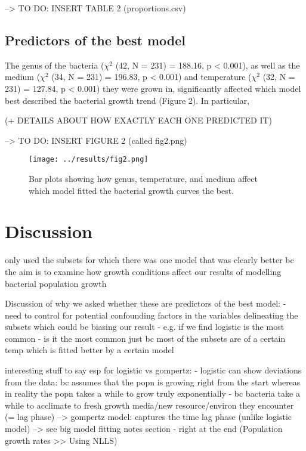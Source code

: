 \documentclass[11pt]{article}
\begin{document}
	--> TO DO: INSERT TABLE 2 (proportions.csv)


	
	\subsection{Predictors of the best model}
	
	The genus of the bacteria ($\chi^2$ (42, N = 231) = 188.16, p < 0.001), as well as the medium ($\chi^2$ (34, N = 231) = 196.83, p < 0.001) and temperature ($\chi^2$ (32, N = 231) = 127.84, p < 0.001) they were grown in, significantly affected which model best described the bacterial growth trend (Figure 2). In particular,  
	
	(+ DETAILS ABOUT HOW EXACTLY EACH ONE PREDICTED IT)
	
	--> TO DO: INSERT FIGURE 2 (called fig2.png)
	
		\begin{figure}[htbp]
		\centering
		\texttt{[image: ../results/fig2.png]}
		\caption{Bar plots showing how genus, temperature, and medium affect which model fitted the bacterial growth curves the best.}
		\label{fig2}
	\end{figure}
	
	
	\section{Discussion}
	
	only used the subsets for which there was one model that was clearly better bc the aim is to examine how growth conditions affect our results of modelling bacterial population growth
	
	
	Discussion of why we asked whether these are predictors of the best model:
	- need to control for potential confounding factors in the variables delineating the subsets which could be biasing our result
	- e.g. if we find logistic is the most common - is it the most common just bc most of the subsets are of a certain temp which is fitted better by a certain model
	
	
	
	interesting stuff to say esp for logistic vs gompertz:
	- logistic can show deviations from the data: bc assumes that the popn is growing right from the start whereas in reality the popn takes a while to grow truly exponentially
	- bc bacteria take a while to acclimate to fresh growth media/new resource/environ they encounter (= lag phase)
	--> gompertz model: captures the time lag phase (unlike logistic model)
	--> see big model fitting notes section - right at the end (Population growth rates >> Using NLLS)
	
\end{document}
